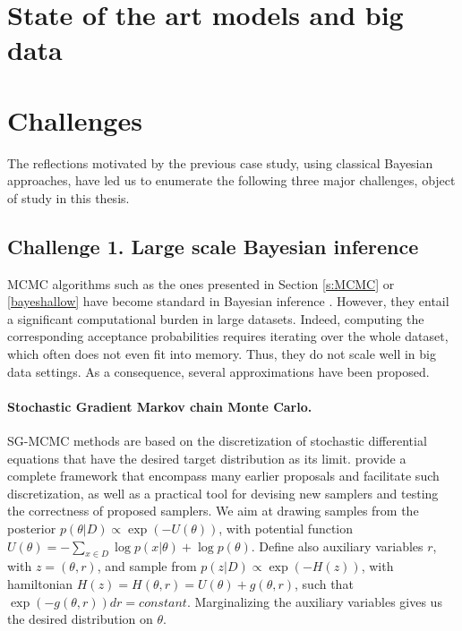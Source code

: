\section{State of the art models and big data}\label{sec:deep_intro}


\section{Challenges}

The reflections motivated by the previous case study, using classical Bayesian approaches, have led us to enumerate the following three major challenges, object of study in this thesis.

\subsection{Challenge 1. Large scale Bayesian inference}


MCMC algorithms such as the ones presented in Section \ref{s:MCMC} or \ref{bayeshallow} 
have become standard in Bayesian inference \parencite{french}.
However, they entail a significant computational burden in large datasets. Indeed, 
computing the corresponding acceptance probabilities 
 requires iterating over the whole dataset, which often does not even
 fit into memory. Thus, they 
  do not scale well in big data settings. 
 As a consequence, several approximations have been proposed.

\paragraph{Stochastic Gradient Markov chain Monte Carlo.}\label{bayesdeep} 

SG-MCMC methods are based on the discretization of 
stochastic differential equations that have the desired target 
distribution as its limit. \parencite{ma2015complete} provide a
complete framework that encompass many earlier proposals and
facilitate such discretization, as well as a practical tool for
devising new samplers and testing the correctness of proposed samplers.
We aim at drawing samples from the
posterior $p(\theta |D) \propto \exp(-U(\theta ))$,
with potential function
$U(\theta ) = -\sum _{x\in D} \log p(x|\theta ) + \log p(\theta )$. Define also auxiliary variables $r$,
with $z=( \theta, r )$, and sample from $p(z|D) \propto  \exp(-H(z))$, with hamiltonian
$H(z) = H(\theta , r) = U(\theta ) + g(\theta , r)$, such that
$\exp(-g(\theta , r))dr = constant$. 
Marginalizing the auxiliary variables gives us the desired distribution on $\theta $.

